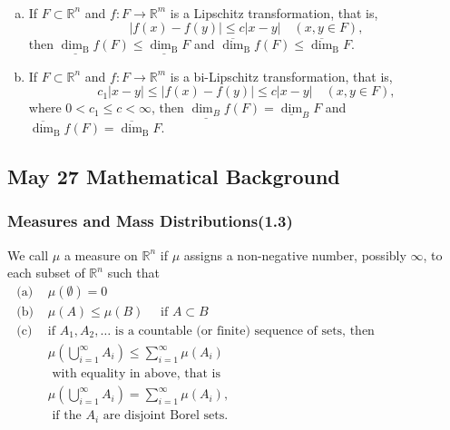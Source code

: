\begin{proposition}\label{prop2.5} $ $
    \begin{enumerate}[a.]
        \item If $F \subset \mathbb{R}^{n}$ and $f: F \rightarrow \mathbb{R}^{m}$ is a Lipschitz transformation, that is,
        $$
        |f(x)-f(y)| \leq c|x-y| \quad(x, y \in F),
        $$
        then $\underline{\operatorname{dim}_{\mathrm{B}}} f(F) \leq \underline{\operatorname{dim}_{\mathrm{B}}} F$ and $\overline{\operatorname{dim}}_{\mathrm{B}} f(F) \leq \overline{\operatorname{dim}}_{\mathrm{B}} F$.
        
        \item If $F \subset \mathbb{R}^{n}$ and $f: F \rightarrow \mathbb{R}^{m}$ is a bi-Lipschitz transformation, that is,
        $$
        c_{1}|x-y| \leq|f(x)-f(y)| \leq c|x-y| \quad(x, y \in F),
        $$
        where $0<c_{1} \leq c<\infty$, then $\underline{\operatorname{dim}_{B}} f(F)=\underline{\operatorname{dim}}_{B} F$ and
        $\overline{\operatorname{dim}}_{\mathrm{B}} f(F)=\overline{\operatorname{dim}}_{\mathrm{B}} F .$
        
    \end{enumerate}
\end{proposition}


\newpage

\subsection{May 27 Mathematical Background}
\subsubsection{Measures and Mass Distributions(1.3)}

\begin{definition}[Measure]\label{measure}
    We call $\mu$ a measure on $\mathbb{R}^{n}$ if $\mu$ assigns a non-negative number, possibly $\infty$, to each subset of $\mathbb{R}^{n}$ such that\\
$
\begin{aligned}
\text { (a) }& \mu(\emptyset)=0 \\
\text { (b) }& \mu(A) \leq \mu(B) \quad \text { if } A \subset B \\
\text { (c) }&\text{if } A_{1}, A_{2}, \ldots \text{ is a countable (or finite) sequence of sets, then }\\
& \mu\left(\bigcup_{i=1}^{\infty} A_{i}\right) \leq \sum_{i=1}^{\infty} \mu\left(A_{i}\right)\\
& \text{ with equality in above, that is }\\
& \mu\left(\bigcup_{i=1}^{\infty} A_{i}\right)=\sum_{i=1}^{\infty} \mu\left(A_{i}\right), \\
&\text{ if the }A_i \text{ are disjoint Borel sets.}
\end{aligned}
$
\end{definition}

